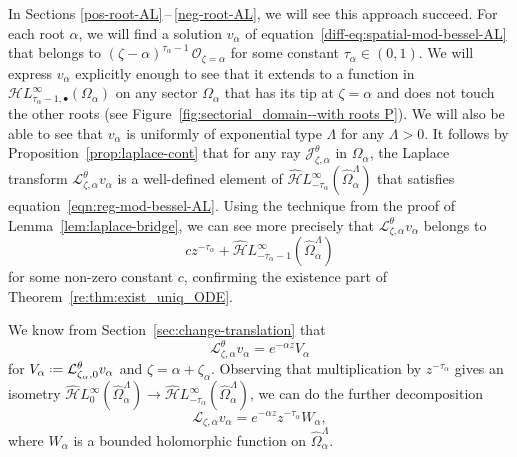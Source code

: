 \documentclass{article}
\newcommand{\singexp}[2]{\mathcal{H}L^\infty_{#1, #2}}
\newcommand{\singexpalg}[1]{\singexp{#1}{\bullet}}
\newcommand{\dualsingexp}[1]{\widehat{\mathcal{H}}L^\infty_{#1}}
\newcommand*{\defeq}{\mathrel{\vcenter{\baselineskip0.5ex \lineskiplimit0pt
                     \hbox{\scriptsize.}\hbox{\scriptsize.}}}%
                     =}
\newcommand{\laplace}{\mathcal{L}}
\theoremstyle{definition}
\theoremstyle{plain}
\begin{document}
In Sections \ref{pos-root-AL}\,--\,\ref{neg-root-AL}, we will see this approach succeed. For each root $\alpha$, we will find a solution $v_\alpha$ of equation~\eqref{diff-eq:spatial-mod-bessel-AL} that belongs to $(\zeta - \alpha)^{\tau_\alpha-1}\,\mathcal{O}_{\zeta = \alpha}$ for some constant $\tau_\alpha \in (0, 1)$. We will express $v_\alpha$ explicitly enough to see that it extends to a function in $\singexpalg{\tau_\alpha-1}(\Omega_\alpha)$ on any sector $\Omega_\alpha$ that has its tip at $\zeta = \alpha$ and does not touch the other roots (see Figure~\ref{fig:sectorial_domain--with roots P}). We will also be able to see that $v_\alpha$ is uniformly of exponential type $\Lambda$ for any $\Lambda > 0$. It follows by Proposition~\ref{prop:laplace-cont} that for any ray $\mathcal{J}^\theta_{\zeta, \alpha}$ in $\Omega_\alpha$, the Laplace transform $\laplace^\theta_{\zeta, \alpha} v_\alpha$ is a well-defined element of $\dualsingexp{-\tau_\alpha}(\widehat{\Omega}_\alpha^\Lambda)$ that satisfies equation~\eqref{eqn:reg-mod-bessel-AL}. Using the technique from the proof of Lemma~\ref{lem:laplace-bridge}, we can see more precisely that $\laplace^\theta_{\zeta, \alpha} v_\alpha$ belongs to
\[ cz^{-\tau_\alpha} + \dualsingexp{-\tau_\alpha-1}(\widehat{\Omega}_\alpha^\Lambda) \]
for some non-zero constant $c$, confirming the existence part of Theorem~\ref{re:thm:exist_uniq_ODE}.

We know from Section~\ref{sec:change-translation} that
\[ \laplace^\theta_{\zeta, \alpha} v_\alpha = e^{-\alpha z} V_\alpha \]
for $V_\alpha \defeq \laplace^\theta_{\zeta_\alpha, 0} v_\alpha$ and $\zeta = \alpha + \zeta_\alpha$. Observing that multiplication by $z^{-\tau_\alpha}$ gives an isometry $\dualsingexp{0}(\widehat{\Omega}_\alpha^\Lambda) \to \dualsingexp{-\tau_\alpha}(\widehat{\Omega}_\alpha^\Lambda)$, we can do the further decomposition
\[ \laplace_{\zeta, \alpha} v_\alpha = e^{-\alpha z} z^{-\tau_\alpha} W_\alpha, \]
where $W_\alpha$ is a bounded holomorphic function on $\widehat{\Omega}_\alpha^\Lambda$.
%
\end{document}
